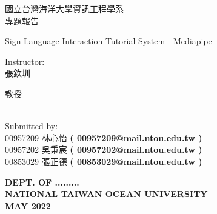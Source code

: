 \documentclass[12pt,a4paper]{report}
\begin{document}
\begin{CJK*}{UTF8}{bkai}
    \begin{center}
        \begin{LARGE}
            國立台灣海洋大學資訊工程學系\\
            專題報告\\
        \end{LARGE}
        \vspace{0.5cm}

        \begin{LARGE}
            Sign Language Interaction Tutorial System - Mediapipe\\
        \end{LARGE}
        \vspace{1cm}
        Instructor:\\
        張欽圳
        \begin{scriptsize}
            教授
        \end{scriptsize}
        \\
        \vspace{1 cm}
        Submitted by: \\

        00957209 林心怡
        \textbf{ ( 00957209@mail.ntou.edu.tw ) }\\
        00957202 吳秉宸
        \textbf{ ( 00957202@mail.ntou.edu.tw ) }\\

        00853029 張正德
        \textbf{ ( 00853029@mail.ntou.edu.tw ) }\\
        \vspace{0.2cm}

    \end{center}

    \begin{center}
        \textbf{DEPT. OF .........}\\

        \textbf{NATIONAL TAIWAN OCEAN UNIVERSITY}\\
        \vspace{12pt}
        \textbf{MAY 2022}\\
    \end{center}
    \thispagestyle{empty}

    \newpage




\end{CJK*}
\end{document}
